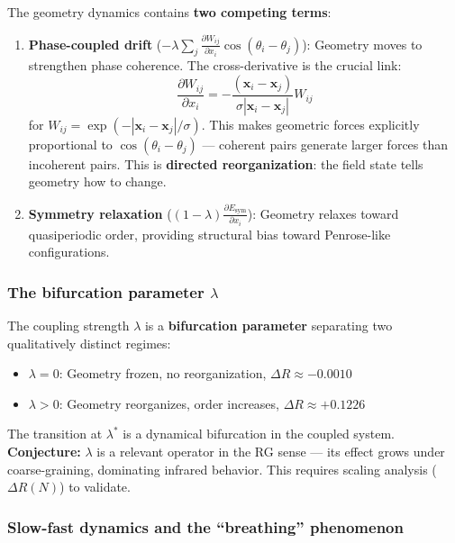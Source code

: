 \documentclass[12pt,a4paper]{article}
\theoremstyle{plain}
\theoremstyle{definition}
\begin{document}
The geometry dynamics contains \textbf{two competing terms}:
\begin{enumerate}
  \item \textbf{Phase-coupled drift} ($-\lambda \sum_j \frac{\partial W_{ij}}{\partial x_i} \cos(\theta_i - \theta_j)$): Geometry moves to strengthen phase coherence. The cross-derivative is the crucial link:
  \begin{equation}
  \label{eq:cross_deriv}
  \frac{\partial W_{ij}}{\partial x_i} = -\frac{(\mathbf{x}_i - \mathbf{x}_j)}{\sigma |\mathbf{x}_i - \mathbf{x}_j|} W_{ij}
  \end{equation}
  for $W_{ij} = \exp(-|\mathbf{x}_i - \mathbf{x}_j|/\sigma)$. This makes geometric forces explicitly proportional to $\cos(\theta_i - \theta_j)$ --- coherent pairs generate larger forces than incoherent pairs. This is \textbf{directed reorganization}: the field state tells geometry how to change.

  \item \textbf{Symmetry relaxation} ($(1-\lambda) \frac{\partial E_{\text{sym}}}{\partial x_i}$): Geometry relaxes toward quasiperiodic order, providing structural bias toward Penrose-like configurations.
\end{enumerate}

\subsubsection{The bifurcation parameter $\lambda$}

The coupling strength $\lambda$ is a \textbf{bifurcation parameter} separating
two qualitatively distinct regimes:
\begin{itemize}
  \item $\lambda = 0$: Geometry frozen, no reorganization, $\Delta R \approx -0.0010$
  \item $\lambda > 0$: Geometry reorganizes, order increases, $\Delta R \approx +0.1226$
\end{itemize}
The transition at $\lambda^*$ is a dynamical bifurcation in the coupled
system. \textbf{Conjecture:} $\lambda$ is a relevant operator in the RG
sense --- its effect grows under coarse-graining, dominating infrared
behavior. This requires scaling analysis ($\Delta R(N)$) to validate.

\subsubsection{Slow-fast dynamics and the ``breathing'' phenomenon}
\end{document}
